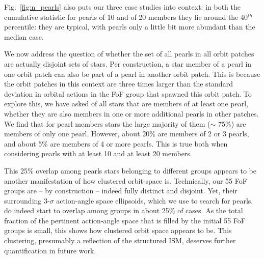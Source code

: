\documentclass[twocolumn]{aastex631}
\begin{document}
Fig.~\ref{fig:n_pearls} also puts our three case studies into context: in both the cumulative statistic for pearls of 10 and of 20 members they lie around the 40$^{th}$ percentile: they are typical, with pearls only a little bit more abundant than the median case.

We now address the question of whether the set of all pearls in all orbit patches are actually disjoint sets of stars. Per construction, a star member of a pearl in one orbit patch can also be part of a pearl in another orbit patch. 
This is because the orbit patches in this context are three times larger than the standard deviation in orbital actions in the FoF group that spawned this orbit patch.
To explore this, we have asked of all stars that are members of at least one pearl, whether they are also members in one or more additional pearls in other patches.  We find that for pearl members stars the large majority of them ($\sim$ 75\%) are members of only one pearl. However,  about 20\% are members of 2 or 3 pearls, and about 5\% are members of 4 or more pearls.  This is true both when considering pearls with at least 10 and at least 20 members.

This 25\% overlap among pearls stars belonging to different groups appears to be another manifestation of how clustered orbit-space is. Technically, our 55 FoF groups are -- by construction -- indeed fully distinct and disjoint. Yet, their surrounding 3-$\sigma$ action-angle space ellipsoids, which we use
to search for pearls, do indeed start to overlap among groups in about 25\% of cases. As the total fraction of the pertinent action-angle space that is filled by the initial 55 FoF groups is small, this shows how clustered orbit space appears to be. This clustering, presumably a reflection of the structured ISM, deserves further quantification in future work. 
\end{document}
